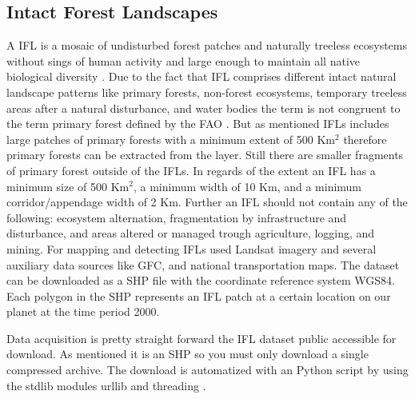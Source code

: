 	\subsection{Intact Forest Landscapes}
		A \ac{IFL} is a mosaic of undisturbed forest patches and naturally treeless ecosystems without sings of human activity and large enough to maintain all native biological diversity \citep{Potapov2017}. Due to the fact that \ac{IFL} comprises different intact natural landscape patterns like primary forests, non-forest ecosystems, temporary treeless areas after a natural disturbance, and water bodies the term is not congruent to the term primary forest defined by the \ac{FAO} \citep{FAO2012}. But as mentioned \ac{IFL}s includes large patches of primary forests with a minimum extent of 500 Km$^2$ therefore primary forests can be extracted from the layer. Still there are smaller fragments of primary forest outside of the \ac{IFL}s. In regards of the extent an \ac{IFL} has a minimum size of 500 Km$^2$, a minimum width of 10 Km, and a minimum corridor/appendage width of 2 Km. Further an \ac{IFL} should not contain any of the following: ecosystem alternation, fragmentation by infrastructure and disturbance, and areas altered or managed trough agriculture, logging, and mining. For mapping and detecting \ac{IFL}s \citeauthor{Potapov2017} used Landsat imagery and several auxiliary data sources like \ac{GFC}, and national transportation maps. The dataset can be downloaded as a \ac{SHP} file with the coordinate reference system \ac{WGS84}. Each polygon in the \ac{SHP} represents an \ac{IFL} patch at a certain location on our planet at the time period 2000.

		Data acquisition is pretty straight forward the \ac{IFL} dataset public accessible for download. As mentioned it is an \ac{SHP} so you must only download a single compressed archive. The download is automatized with an Python script by using the \ac{stdlib} modules urllib and threading \citep{Rossum2018}.

